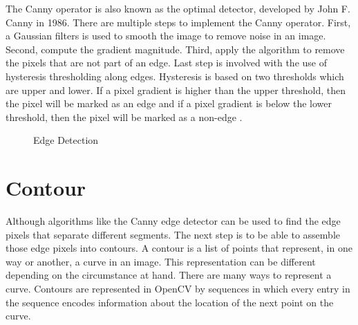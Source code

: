 The Canny operator is also known as the optimal detector, developed by John F. Canny in 1986.  There are multiple steps to implement the Canny operator. First, a Gaussian filters is used to smooth the image to remove noise in an image. Second, compute the gradient magnitude. Third, apply the algorithm to remove the pixels that are not part of an edge. Last step is involved with the use of hysteresis thresholding along edges. Hysteresis is based on two thresholds which are upper and lower. If a pixel gradient is higher than the upper threshold, then the pixel will be marked as an edge and if a pixel gradient is below the lower threshold, then the pixel will be marked as a non-edge\cite{EdgeDetection} \cite{CannyEdgeDetection}.

\begin{figure}[H]
\centering
{}
\caption {Edge Detection}
\label {fig:EdgeDetection}
\end{figure}

\section{Contour}
Although algorithms like the Canny edge detector can be used to find the edge pixels that separate different segments. The next step is to be able to assemble those edge pixels into contours.
A contour is a list of points that represent, in one way or another, a curve in an image. This representation can be different depending on the circumstance at hand. There are many ways to represent a curve. Contours are represented in OpenCV by sequences in which every entry in the sequence encodes information about the location of the next point on the curve.

